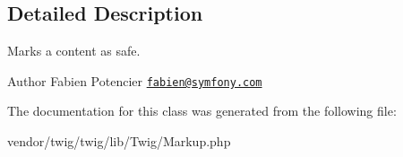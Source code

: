 \subsection{Detailed Description}
Marks a content as safe.

\begin{DoxyAuthor}{Author}
Fabien Potencier \href{mailto:fabien@symfony.com}{\tt fabien@symfony.\+com} 
\end{DoxyAuthor}


The documentation for this class was generated from the following file\+:\begin{DoxyCompactItemize}
\item 
vendor/twig/twig/lib/\+Twig/Markup.\+php\end{DoxyCompactItemize}
